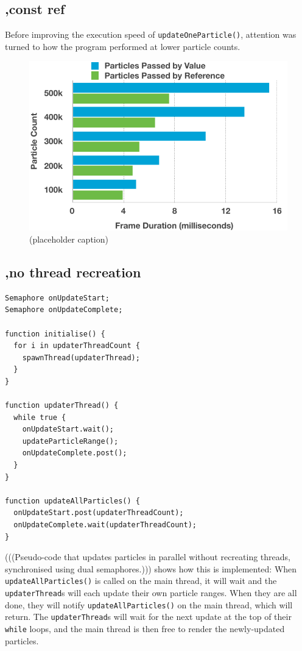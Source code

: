 \documentclass[11pt, a4paper, twocolumn]{article}
\begin{document}
\subsection{,const ref}

Before improving the execution speed of \verb|updateOneParticle()|, attention was turned to how the program performed at lower particle counts.

\lipsum[1-1]

\begin{figure}[h]
\includegraphics[width=\linewidth]{pass-by-value-reference}
\caption{(placeholder caption)}
\label{fig:pass-by-value-reference}
\end{figure}

\subsection{,no thread recreation}

\lipsum[1-1]

\begin{verbatim}
Semaphore onUpdateStart;
Semaphore onUpdateComplete;

function initialise() {
  for i in updaterThreadCount {
    spawnThread(updaterThread);
  }
}

function updaterThread() {
  while true {
    onUpdateStart.wait();
    updateParticleRange();
    onUpdateComplete.post();
  }
}

function updateAllParticles() {
  onUpdateStart.post(updaterThreadCount);
  onUpdateComplete.wait(updaterThreadCount);
}
\end{verbatim}

(((Pseudo-code that updates particles in parallel without recreating threads, synchronised using dual semaphores.))) shows how this is implemented: When \verb|updateAllParticles()| is called on the main thread, it will wait and the \verb|updaterThread|s will each update their own particle ranges. When they are all done, they will notify \verb|updateAllParticles()| on the main thread, which will return. The \verb|updaterThread|s will wait for the next update at the top of their \verb|while| loops, and the main thread is then free to render the newly-updated particles.
\end{document}
